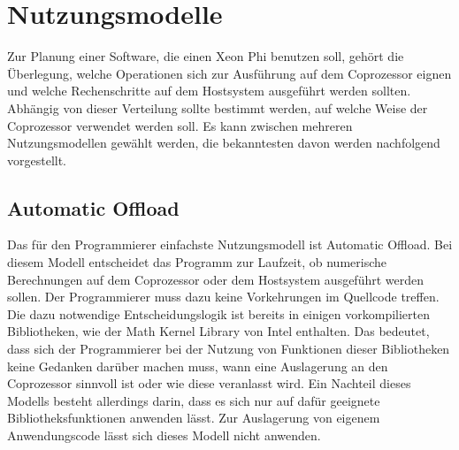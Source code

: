 \documentclass[../main.tex]{subfiles}
\begin{document}
\section{Nutzungsmodelle}
Zur Planung einer Software, die einen Xeon Phi benutzen soll, gehört die Überlegung, welche Operationen sich zur Ausführung auf dem Coprozessor eignen und welche Rechenschritte auf dem Hostsystem ausgeführt werden sollten. Abhängig von dieser Verteilung sollte bestimmt werden, auf welche Weise der Coprozessor verwendet werden soll. Es kann zwischen mehreren Nutzungsmodellen gewählt werden, die bekanntesten davon werden nachfolgend vorgestellt. 

\subsection{Automatic Offload}
Das für den Programmierer einfachste Nutzungsmodell ist Automatic Offload. Bei diesem Modell entscheidet das Programm zur Laufzeit, ob numerische Berechnungen auf dem Coprozessor oder dem Hostsystem ausgeführt werden sollen. Der Programmierer muss dazu keine Vorkehrungen im Quellcode treffen. Die dazu notwendige Entscheidungslogik ist bereits in einigen vorkompilierten Bibliotheken, wie der Math Kernel Library von Intel enthalten. Das bedeutet, dass sich der Programmierer bei der Nutzung von Funktionen dieser Bibliotheken keine Gedanken darüber machen muss, wann eine Auslagerung an den Coprozessor sinnvoll ist oder wie diese veranlasst wird. Ein Nachteil dieses Modells besteht allerdings darin, dass es sich nur auf dafür geeignete Bibliotheksfunktionen anwenden lässt. Zur Auslagerung von eigenem Anwendungscode lässt sich dieses Modell nicht anwenden. 
\end{document}
